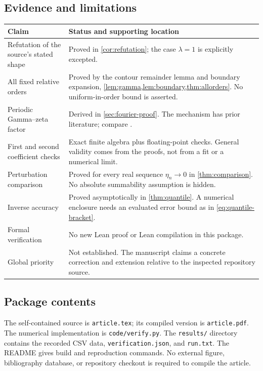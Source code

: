 \documentclass[11pt,a4paper]{article}
\numberwithin{equation}{section}
\theoremstyle{definition}
\begin{document}
\subsection{Evidence and limitations}
\begin{longtable}{@{}p{}p{}@{}}
\toprule
Claim & Status and supporting location\\
\midrule
\endhead
Refutation of the source's stated shape & Proved in \cref{cor:refutation}; the case $\lambda=1$ is explicitly excepted.\\
All fixed relative orders & Proved by the contour remainder lemma and boundary expansion, \cref{lem:gamma,lem:boundary,thm:allorders}. No uniform-in-order bound is asserted.\\
Periodic Gamma--zeta factor & Derived in \cref{sec:fourier-proof}. The mechanism has prior literature; compare \cite{fgd,tavares}.\\
First and second coefficient checks & Exact finite algebra plus floating-point checks. General validity comes from the proofs, not from a fit or a numerical limit.\\
Perturbation comparison & Proved for every real sequence $\eta_n\to0$ in \cref{thm:comparison}. No absolute summability assumption is hidden.\\
Inverse accuracy & Proved asymptotically in \cref{thm:quantile}. A numerical enclosure needs an evaluated error bound as in \eqref{eq:quantile-bracket}.\\
Formal verification & No new Lean proof or Lean compilation in this package.\\
Global priority & Not established. The manuscript claims a concrete correction and extension relative to the inspected repository source.\\
\bottomrule
\end{longtable}

\subsection{Package contents}
The self-contained source is \texttt{article.tex}; its compiled version is \texttt{article.pdf}. The numerical implementation is \texttt{code/verify.py}. The \texttt{results/} directory contains the recorded CSV data, \texttt{verification.json}, and \texttt{run.txt}. The README gives build and reproduction commands. No external figure, bibliography database, or repository checkout is required to compile the article.
\end{document}
